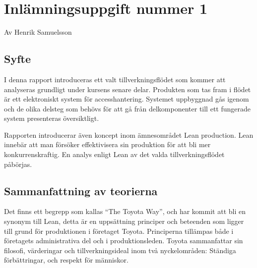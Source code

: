 \documentclass{article}
\begin{document}
\section*{Inlämningsuppgift nummer 1}
Av Henrik Samuelsson
\subsection*{Syfte}
I denna rapport introduceras ett valt tillverkningsflödet som kommer att analyseras grundligt under kursens senare delar. Produkten som tas fram i flödet är  ett elektroniskt system för accesshantering. Systemet uppbyggnad gås igenom och de olika delsteg som behövs för att gå från delkomponenter till ett fungerade system presenteras översiktligt.

Rapporten introducerar även koncept inom ämnesområdet Lean production. Lean innebär att man försöker effektivisera sin produktion för att bli mer konkurrenskraftig. En analys enligt Lean av det valda tillverkningsflödet påbörjas.

\subsection*{Sammanfattning av teorierna}
Det finns ett begrepp som kallas ``The Toyota Way'', och har kommit att bli en synonym till Lean, detta är en uppsättning principer och beteenden som ligger till grund för produktionen i företaget Toyota. Principerna tillämpas både i företagets administrativa del och i produktionsleden. Toyota sammanfattar sin filosofi, värderingar och tillverkningsideal inom två nyckelområden: Ständiga förbättringar, och respekt för människor.
\end{document}
